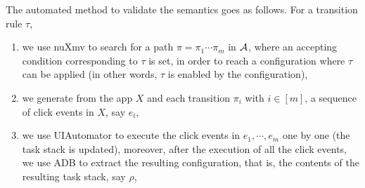 The automated method to validate the semantics goes as follows. For a transition rule $\tau$,  
\begin{enumerate}
\item we use nuXmv to search for a path $\pi = \pi_1 \cdots \pi_m$ in ${\mathcal{A} }$, where an accepting condition corresponding to $\tau$ is set, in order to reach a configuration where $\tau$ can be applied (in other words, $\tau$ is enabled by the configuration), 
%
\item we generate from the app $X$ and each transition $\pi_i$ with $i \in [m]$, a sequence of click events in $X$, say $e_i$,
%
\item we use UIAutomator to execute the click events in $e_1, \cdots, e_m$ one by one (the task stack is updated), moreover, after the execution of all the click events, we use ADB to extract the resulting configuration, that is, the contents of the resulting task stack, say $\rho$,  


\end{enumerate}
